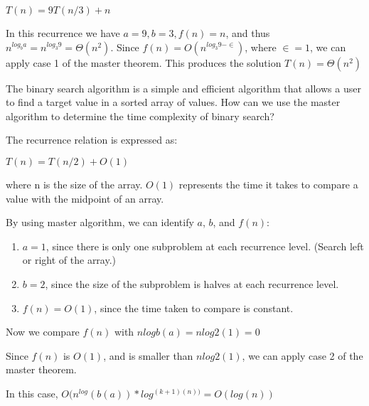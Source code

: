 \documentclass{article}
\begin{document}
\smallskip

\textit{$T(n) = 9T(n/3) + n$}

\smallskip

\noindent In this recurrence we have \textit{$a = 9, b = 3, f(n) = n$}, and thus \textit{$n^{log_{b}a} = n^{log_{3}9} = \Theta(n^2)$}. Since 
\textit{$f(n) = O(n^{log_{3}9 - \in})$}, where \textit{$\in = 1$}, we can apply case 1 of the master theorem. This produces the solution
\textit{$T(n) = \Theta(n^2)$}

\smallskip The binary search algorithm is a simple and efficient algorithm that allows a user to find a target value in a sorted array of values.
\noindent How can we use the master algorithm to determine the time complexity of binary search?

\noindent The recurrence relation is expressed as:

\bigskip

\textit{$T(n) = T(n/2) + O(1)$}

\bigskip

\noindent where n is the size of the array. \textit{$O(1)$} represents the time it takes to compare a value with the midpoint of an array.

\smallskip

By using master algorithm, we can identify \textit{$a$}, \textit{$b$}, and \textit{$f(n)$}:

\begin{enumerate}

	\item \textit{$a = 1$}, since there is only one subproblem at each recurrence level. (Search left or right of the array.)
	
	\item \textit{$b = 2$}, since the size of the subproblem is halves at each recurrence level.
	
	\item \textit{$f(n) = O(1)$}, since the time taken to compare is constant.

\end{enumerate}

\smallskip

\noindent Now we compare \textit{$f(n)$} with \textit{$nlogb(a) = nlog2(1) = 0$}

\noindent Since \textit{$f(n)$} is \textit{$O(1)$}, and is smaller than \textit{$nlog2(1)$}, we can apply case 2 of the master theorem.

\noindent In this case, \textit{$O(n^{log}(b(a)) * log^{(k+1)(n))} = O(log(n))$}
\end{document}
